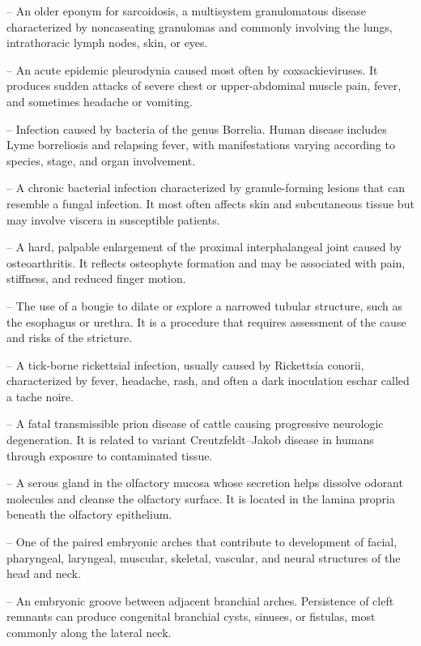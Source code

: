 -- An older eponym for sarcoidosis, a multisystem granulomatous disease characterized by noncaseating granulomas and commonly involving the lungs, intrathoracic lymph nodes, skin, or eyes.


-- An acute epidemic pleurodynia caused most often by coxsackieviruses. It produces sudden attacks of severe chest or upper-abdominal muscle pain, fever, and sometimes headache or vomiting.

-- Infection caused by bacteria of the genus Borrelia. Human disease includes Lyme borreliosis and relapsing fever, with manifestations varying according to species, stage, and organ involvement.

-- A chronic bacterial infection characterized by granule-forming lesions that can resemble a fungal infection. It most often affects skin and subcutaneous tissue but may involve viscera in susceptible patients.

-- A hard, palpable enlargement of the proximal interphalangeal joint caused by osteoarthritis. It reflects osteophyte formation and may be associated with pain, stiffness, and reduced finger motion.


-- The use of a bougie to dilate or explore a narrowed tubular structure, such as the esophagus or urethra. It is a procedure that requires assessment of the cause and risks of the stricture.

-- A tick-borne rickettsial infection, usually caused by Rickettsia conorii, characterized by fever, headache, rash, and often a dark inoculation eschar called a tache noire.

-- A fatal transmissible prion disease of cattle causing progressive neurologic degeneration. It is related to variant Creutzfeldt--Jakob disease in humans through exposure to contaminated tissue.

-- A serous gland in the olfactory mucosa whose secretion helps dissolve odorant molecules and cleanse the olfactory surface. It is located in the lamina propria beneath the olfactory epithelium.

-- One of the paired embryonic arches that contribute to development of facial, pharyngeal, laryngeal, muscular, skeletal, vascular, and neural structures of the head and neck.


-- An embryonic groove between adjacent branchial arches. Persistence of cleft remnants can produce congenital branchial cysts, sinuses, or fistulas, most commonly along the lateral neck.

